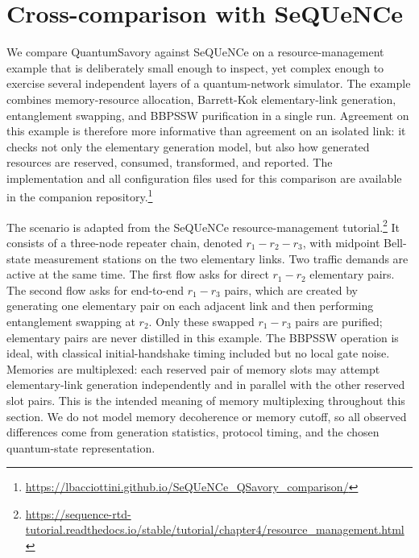 \section{Cross-comparison with SeQUeNCe\label{sequence}}

We compare QuantumSavory against SeQUeNCe on a resource-management example that
is deliberately small enough to inspect, yet complex enough to exercise several
independent layers of a quantum-network simulator.  The example combines
memory-resource allocation, Barrett-Kok elementary-link generation,
entanglement swapping, and BBPSSW purification in a single run.  Agreement on
this example is therefore more informative than agreement on an isolated link:
it checks not only the elementary generation model, but also how generated
resources are reserved, consumed, transformed, and reported.  The implementation
and all configuration files used for this comparison are available in the
companion repository.\footnote{\url{https://lbacciottini.github.io/SeQUeNCe_QSavory_comparison/}}

The scenario is adapted from the SeQUeNCe resource-management
tutorial.\footnote{\url{https://sequence-rtd-tutorial.readthedocs.io/stable/tutorial/chapter4/resource_management.html}}
It consists of a three-node repeater chain, denoted
$r_1-r_2-r_3$, with midpoint Bell-state measurement stations on the two
elementary links.  Two traffic demands are active at the same time.  The first
flow asks for direct $r_1-r_2$ elementary pairs.  The second flow asks for
end-to-end $r_1-r_3$ pairs, which are created by generating one elementary pair
on each adjacent link and then performing entanglement swapping at $r_2$.
Only these swapped $r_1-r_3$ pairs are purified; elementary pairs are never
distilled in this example.  The BBPSSW operation is ideal, with classical
initial-handshake timing included but no local gate noise.  Memories are
multiplexed: each reserved pair of
memory slots may attempt elementary-link generation independently and in
parallel with the other reserved slot pairs.  This is the intended meaning of
memory multiplexing throughout this section.  We do not model memory
decoherence or memory cutoff, so all observed differences come from generation
statistics, protocol timing, and the chosen quantum-state representation.

